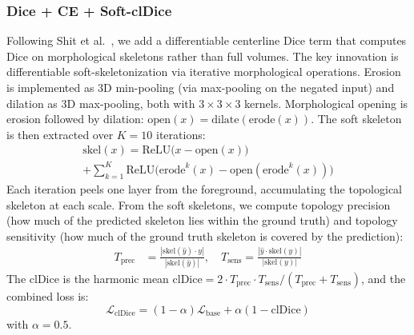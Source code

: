 \documentclass[conference]{IEEEtran}
\begin{document}
\subsubsection{Dice + CE + Soft-clDice}
Following Shit et al.~\cite{shit2021}, we add a differentiable centerline Dice term that computes Dice on morphological skeletons rather than full volumes. The key innovation is differentiable soft-skeletonization via iterative morphological operations. Erosion is implemented as 3D min-pooling (via max-pooling on the negated input) and dilation as 3D max-pooling, both with $3\times3\times3$ kernels. Morphological opening is erosion followed by dilation: $\text{open}(x) = \text{dilate}(\text{erode}(x))$. The soft skeleton is then extracted over $K=10$ iterations:
\begin{multline}
    \text{skel}(x) = \text{ReLU}\bigl(x - \text{open}(x)\bigr) \\
    + \sum_{k=1}^{K} \text{ReLU}\bigl(\text{erode}^k(x) - \text{open}(\text{erode}^k(x))\bigr)
\end{multline}
Each iteration peels one layer from the foreground, accumulating the topological skeleton at each scale. From the soft skeletons, we compute topology precision (how much of the predicted skeleton lies within the ground truth) and topology sensitivity (how much of the ground truth skeleton is covered by the prediction):
\begin{align}
    T_{\text{prec}} &= \frac{|\text{skel}(\hat{y}) \cdot y|}{|\text{skel}(\hat{y})|}, \quad
    T_{\text{sens}} = \frac{|\hat{y} \cdot \text{skel}(y)|}{|\text{skel}(y)|}
\end{align}
The clDice is the harmonic mean $\text{clDice} = 2 \cdot T_{\text{prec}} \cdot T_{\text{sens}} / (T_{\text{prec}} + T_{\text{sens}})$, and the combined loss is:
\begin{equation}
    \mathcal{L}_{\text{clDice}} = (1-\alpha)\mathcal{L}_{\text{base}} + \alpha(1 - \text{clDice})
\end{equation}
with $\alpha = 0.5$.
\end{document}
